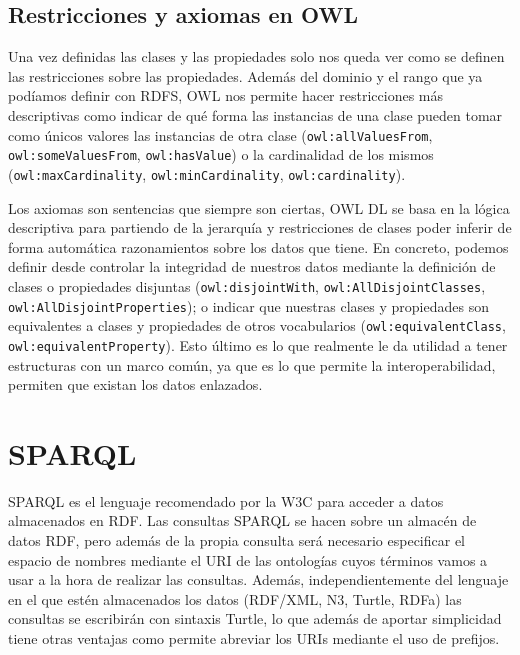 \newpage
\subsection{Restricciones y axiomas en OWL}	
Una vez definidas las clases y las propiedades solo nos queda ver como se definen las restricciones sobre las propiedades. Además del dominio y el rango que ya podíamos definir con {\sf RDFS}, {\sf OWL} nos permite hacer restricciones más descriptivas como indicar de qué forma las instancias de una clase pueden tomar como únicos valores las instancias de otra clase ({\tt owl:allValuesFrom}, {\tt owl:someValuesFrom}, {\tt owl:hasValue}) o la cardinalidad de los mismos ({\tt owl:maxCardinality}, {\tt owl:minCardinality}, {\tt owl:cardinality}).

\bigskip
Los axiomas son sentencias que siempre son ciertas, {\sf OWL DL} se basa en la lógica descriptiva para partiendo de la jerarquía y restricciones de clases poder inferir de forma automática razonamientos sobre los datos que tiene. En concreto, podemos definir desde controlar la integridad de nuestros datos mediante la definición de clases o propiedades disjuntas ({\tt owl:disjointWith}, {\tt owl:AllDisjointClasses}, {\tt owl:AllDisjointProperties}); o indicar que nuestras clases y propiedades son equivalentes a clases y propiedades de otros vocabularios ({\tt owl:equivalentClass}, {\tt owl:equivalentProperty}). Esto último es lo que realmente le da utilidad a tener estructuras con un marco común, ya que es lo que permite la interoperabilidad, permiten que existan los datos enlazados.

\section{SPARQL}

{\sf SPARQL} es el lenguaje recomendado por la {\sf W3C} para acceder a datos almacenados en {\sf RDF}. Las consultas {\sf SPARQL} se hacen sobre un almacén de datos {\sf RDF}, pero además de la propia consulta será necesario especificar el espacio de nombres mediante el {\sf URI} de las ontologías cuyos términos vamos a usar a la hora de realizar las consultas. Además, independientemente del lenguaje en el que estén almacenados los datos ({\sf RDF/XML}, {\sf N3}, {\sf Turtle}, {\sf RDFa}) las consultas se escribirán con sintaxis {\sf Turtle}, lo que además de aportar simplicidad tiene otras ventajas como permite abreviar los {\sf URIs} mediante el uso de prefijos.

